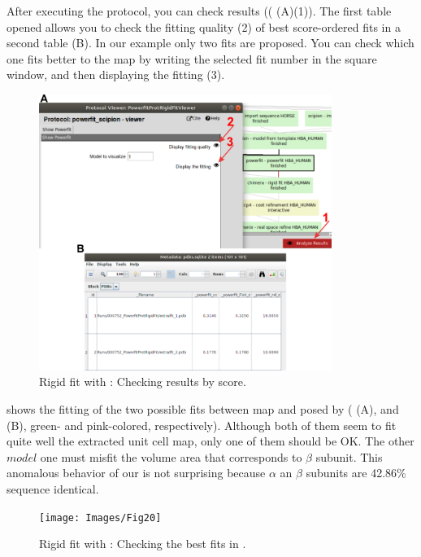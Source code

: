  After executing the  protocol, you can check results (( (A)(1)). The first table opened allows you to check the fitting quality (2) of best score-ordered fits in a second table (B). In our example only two fits are proposed. You can check which one fits better to the map by writing the selected fit number in the  square window, and then displaying the fitting (3).
 
 \begin{figure}[H]
  \centering 
  \captionsetup{width=.7\linewidth} 
  \includegraphics[width=0.85\textwidth]{Images/Fig19}
  \caption{Rigid fit with \powerfit: Checking results by score.}
  \label{fig:powerfit_results_table}
  \end{figure}
  
   shows the fitting of the two possible fits between map and  posed by \powerfit ( (A), and  (B), green- and pink-colored, respectively). Although both of them seem to fit quite well the extracted unit cell map, only one of them should be OK. The other $model$ one must misfit the volume area that corresponds to  $\beta$ subunit. This anomalous behavior of our  is not surprising because  $\alpha$ an $\beta$ subunits are 42.86\% sequence identical. 
  
 \begin{figure}[H]
  \centering 
  \captionsetup{width=.7\linewidth} 
  \texttt{[image: Images/Fig20]}
  \caption{Rigid fit with \powerfit: Checking the best fits in \chimera.}
  \label{fig:powerfit_results_figs}
  \end{figure}
  
